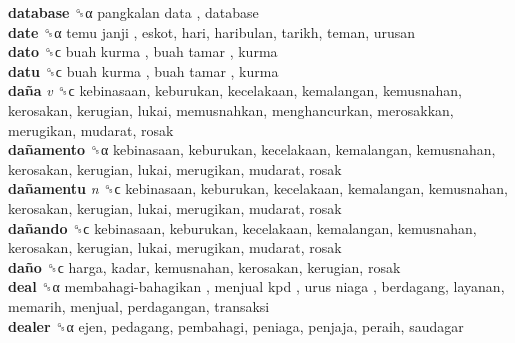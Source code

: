 \textbf{database} ␝α   pangkalan data , database  \\
\textbf{date} ␝α   temu janji , eskot, hari, haribulan, tarikh, teman, urusan  \\
\textbf{dato} ␝ϲ   buah kurma ,  buah tamar , kurma  \\
\textbf{datu} ␝ϲ   buah kurma ,  buah tamar , kurma  \\
\textbf{daña} \emph{v}  ␝ϲ  kebinasaan, keburukan, kecelakaan, kemalangan, kemusnahan, kerosakan, kerugian, lukai, memusnahkan, menghancurkan, merosakkan, merugikan, mudarat, rosak  \\
\textbf{dañamento} ␝α  kebinasaan, keburukan, kecelakaan, kemalangan, kemusnahan, kerosakan, kerugian, lukai, merugikan, mudarat, rosak  \\
\textbf{dañamentu} \emph{n}  ␝ϲ  kebinasaan, keburukan, kecelakaan, kemalangan, kemusnahan, kerosakan, kerugian, lukai, merugikan, mudarat, rosak  \\
\textbf{dañando} ␝ϲ  kebinasaan, keburukan, kecelakaan, kemalangan, kemusnahan, kerosakan, kerugian, lukai, merugikan, mudarat, rosak  \\
\textbf{daño} ␝ϲ  harga, kadar, kemusnahan, kerosakan, kerugian, rosak  \\
\textbf{deal} ␝α   membahagi-bahagikan ,  menjual kpd ,  urus niaga , berdagang, layanan, memarih, menjual, perdagangan, transaksi  \\
\textbf{dealer} ␝α  ejen, pedagang, pembahagi, peniaga, penjaja, peraih, saudagar  \\
